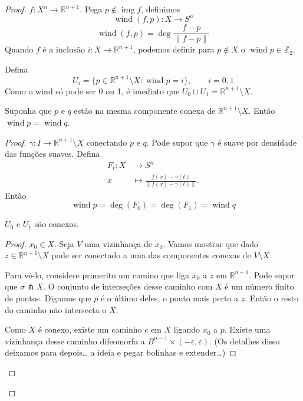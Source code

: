 \begin{proof}\leavevmode
\(f : X^n \to \mathbb{R}^{n+1}\). Pega \(p \not \in \operatorname{img} f\), definimos
\[\operatorname{wind}(f,p): X \to S^{n}\]
\[\operatorname{wind}(f,p)=\operatorname{deg}\frac{f-p}{\|f-p\|}\]
Quando \(f\) é a inclusão \(i:X \to \mathbb{R}^{n+1}\), podemos definir para \(p \not \in X\) o \(\operatorname{wind}p \in \mathbb{Z}_2\).

Defina
\[U_i=\{p \in \mathbb{R}^{n+1}\setminus X: \operatorname{wind}p=i\},\qquad i=0,1\]
Como o wind só pode ser 0 ou 1, é imediato que \(U_0 \sqcup U_1=\mathbb{R}^{n+1}\setminus X\).

\begin{lemma}\leavevmode
Suponha que \(p\) e \(q\) estão na mesma componente conexa de \(\mathbb{R}^{n+1}\setminus X\). Então \(\operatorname{wind} p = \operatorname{wind} q\).
\end{lemma}
\begin{proof}\leavevmode
	\(\gamma:I \to \mathbb{R}^{n+1}\setminus X\) conectando \(p\) e \(q\). Pode supor que \(\gamma\) é suave por densidade das funções suaves. Defina
	\begin{align*}
		F_t: X &\longrightarrow S^{n} \\
		x &\longmapsto \frac{f(x)-\gamma(t)}{\|f(x)-\gamma(t)\|}.
	\end{align*}
	Então
	\[\operatorname{wind}p=\operatorname{deg}(F_0)=\operatorname{deg}(F_1)=\operatorname{wind} q\]
	\begin{claim}\leavevmode
	\(U_0\) e \(U_1\) são conexos.
	\end{claim}
	\begin{proof}\leavevmode
	\(x_0 \in X\). Seja \(V\) uma vizinhança de \(x_0\). Vamos mostrar que dado \(z \in \mathbb{R}^{n+1}\setminus X\) pode ser conectado a uma das componentes conexas de \(V\setminus X\).

	Para vé-lo, considere primerito um camino que liga \(x_0\) a \(z\) em \(\mathbb{R}^{n+1}\). Pode supor que \(\sigma \pitchfork  X\). O conjunto de interseções desse caminho com \(X\) é um número finito de pontos. Digamos que \(p\) é o último deles, o ponto mais perto a \(z\). Então o resto do caminho não intersecta o \(X\).

	Como \(X\) é conexo, existe um caminho \(c\) em \(X\) ligando \(x_0\) a \(p\). Existe uma vizinhança desse caminho difeomorfa a \(B^{n-1}\times(-\varepsilon,\varepsilon)\). (Os detalhes disso deixamos para depois… a ideia e pegar bolinhas e extender…)


\end{proof}
\end{proof}
\end{proof}
